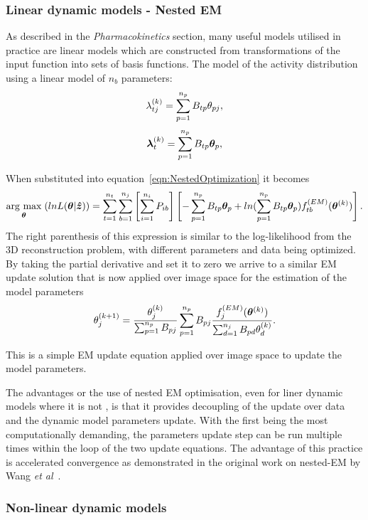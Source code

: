 \subsubsection{Linear dynamic models - Nested EM}
As described in the \textit{Pharmacokinetics} section, many useful models utilised in practice are linear models which are constructed from transformations of the input function into sets of basis functions.
The model of the activity distribution using a linear model of $n_b$ parameters:
\begin{equation}
\lambda_{tj}^{(k)} = \sum_{p=1}^{n_p} B_{tp}   \theta_{pj} \\, 
\end{equation}
\begin{equation}
\bm\lambda_{t}^{(k)} = \sum_{p=1}^{n_p} B_{tp}  \bm\theta_{p}  \\,
\end{equation}

When substituted into equation~\ref{eqn:NestedOptimization} it becomes
\begin{equation}
\underset{\bm{\theta}}{\operatorname{arg}\,\operatorname{max}}\;(lnL(\bm{\theta}|\bm{\hat{z}})) = 
\sum_{t=1}^{n_t} \sum_{b=1}^{n_j} \left[ \sum_{i=1}^{n_i}  P_{ib} \right]
\left[ 
-\sum_{p=1}^{n_p} B_{tp} \bm\theta_{p} + 
ln( \sum_{p=1}^{n_p} B_{tp} \bm\theta_{p}) 
f_{tb}^{(EM)}(\bm{\theta}^{(k)})
\right] \\ .
\end{equation}
The right parenthesis of this expression is similar to the log-likelihood from the 3D reconstruction problem, with different parameters and data being optimized. By taking the partial derivative and set it to zero we arrive to a similar EM update solution that is now applied over image space for the estimation of the model parameters 
\begin{equation}
\theta_j^{(k+1)} = \frac{\theta_j^{(k)}}
{\sum_{p=1}^{n_p} B_{pj}} 
\sum_{p=1}^{n_p} B_{pj} 
\frac{f_{j}^{(EM)}(\bm{\theta}^{(k)})}{\sum_{d=1}^{n_j} B_{pd}\theta_d^{(k)} } \\.
\end{equation}

This is a simple EM update equation applied over image space to update the model parameters. 

The advantages or the use of nested EM optimisation, even for liner dynamic models where it is not , is that it provides decoupling of the update over data and the dynamic model parameters update. With the first being the most computationally demanding, the parameters update step can be run multiple times within the loop of the two update equations. The advantage of this practice is accelerated convergence as demonstrated in the original work on nested-EM by Wang \textit{et al}~\cite{Wang2010}. 





\subsubsection{Non-linear dynamic models}